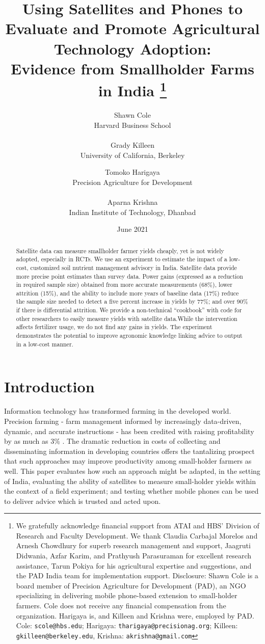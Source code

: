 \documentclass{article}
\title{\large \textbf{Using Satellites and Phones to Evaluate and Promote Agricultural Technology Adoption: \\ Evidence from Smallholder Farms in India}
\thanks{We gratefully acknowledge financial support from ATAI and HBS’ Division of Research and Faculty Development. We thank Claudia Carbajal Morelos and Arnesh Chowdhury for superb research management and support, Jaagruti Didwania, Azfar Karim, and Prathyush Parasuraman for excellent research assistance, Tarun Pokiya for his agricultural expertise and suggestions, and the PAD India team for implementation support. 
Disclosure: Shawn Cole is a board member of Precision Agriculture for Development (PAD), an NGO specializing in delivering mobile phone-based extension to small-holder farmers. Cole does not receive any financial compensation from the organization. Harigaya is, and Killeen and Krishna were, employed by PAD. Cole: \texttt{scole@hbs.edu}; Harigaya: \texttt{tharigaya@precisionag.org}; Killeen: \texttt{gkilleen@berkeley.edu}, Krishna: \texttt{akrishna@gmail.com}}}
\author{
    Shawn Cole\\
    Harvard Business School\\
    \\[-0.5em] 
    Grady Killeen \\
    University of California, Berkeley \\
  \and
    Tomoko Harigaya\\
    Precision Agriculture for Development\\
    \\[-0.5em] 
    Aparna Krishna \\
    Indian Institute of Technology, Dhanbad
}
\date{June 2021}
\begin{document}


\begin{titlepage}

\maketitle
\thispagestyle{empty}
    \begin{abstract}
        \singlespace
      Satellite data can measure smallholder farmer yields cheaply, yet is not widely adopted, especially in RCTs. We use an experiment to estimate the impact of a low-cost, customized soil nutrient management advisory in India. Satellite data provide more precise point estimates than survey data. Power gains (expressed as a reduction in required sample size) obtained from more accurate measurements (68\%), lower attrition (15\%), and the ability to include more years of baseline data (17\%) reduce the sample size needed to detect a five percent increase in yields by 77\%; and over 90\%  if there is differential attrition. We provide a non-technical “cookbook” with code for other researchers to easily measure yields with satellite data.While the intervention affects fertilizer usage, we do not find any gains in yields. The experiment demonstrates the potential to improve agronomic knowledge linking advice to output in a low-cost manner.
    \end{abstract}
\end{titlepage}

\section{Introduction}

Information technology has transformed farming in the developed world. Precision farming - farm management informed by increasingly data-driven, dynamic, and accurate instructions - has been credited with raising profitability by as much as 3\% \citep{Schimmelpfennig2016FarmAgriculture}. The dramatic reduction in costs of collecting and disseminating information in developing countries offers the tantalizing prospect that such approaches may improve productivity among small-holder farmers as well. This paper evaluates how such an approach might be adapted, in the setting of India, evaluating the ability of satellites to measure small-holder yields within the context of a field experiment; and testing whether mobile phones can be used to deliver advice which is trusted and acted upon. 
\end{document}
